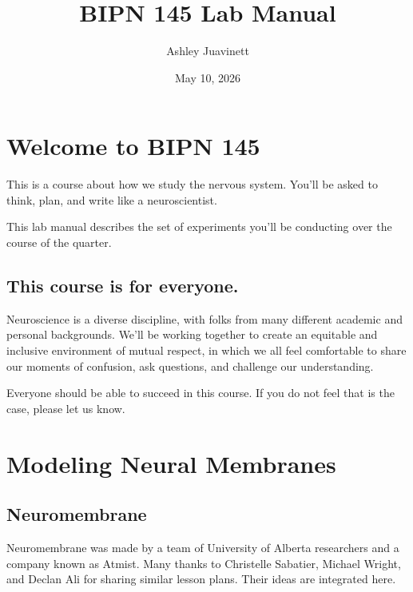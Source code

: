 \documentclass[letterpaper,10pt,english]{jupyterBook}
\title{BIPN 145 Lab Manual}
\date{May 10, 2026}
\author{Ashley Juavinett}
\begin{document}
\pagestyle{empty}
\sphinxmaketitle
\pagestyle{plain}
\sphinxtableofcontents
\pagestyle{normal}
\label{\detokenize{Cover::doc}}


\sphinxstepscope


\chapter{Welcome to BIPN 145}
\label{\detokenize{Introduction:welcome-to-bipn-145}}\label{\detokenize{Introduction::doc}}
\sphinxAtStartPar
This is a course about how we study the nervous system.
You’ll be asked to think, plan, and write like a neuroscientist.

\sphinxAtStartPar
This lab manual describes the set of experiments
you’ll be conducting over the course of the quarter.


\section{This course is for everyone.}
\label{\detokenize{Introduction:this-course-is-for-everyone}}
\sphinxAtStartPar
Neuroscience is a diverse discipline, with folks from many different academic and personal backgrounds. We’ll be working together to create an equitable and inclusive environment of mutual respect, in which we all feel comfortable to share our moments of confusion, ask questions, and challenge our understanding.

\sphinxAtStartPar
Everyone should be able to succeed in this course.
If you do not feel that is the case, please let us know.

\sphinxstepscope


\chapter{Modeling Neural Membranes}
\label{\detokenize{ModelingNeuralMembranes:modeling-neural-membranes}}\label{\detokenize{ModelingNeuralMembranes::doc}}
\sphinxAtStartPar
{}


\section{Neuromembrane}
\label{\detokenize{ModelingNeuralMembranes:neuromembrane}}
\sphinxAtStartPar
Neuromembrane was made by a team of University of Alberta researchers and a company known as Atmist. Many thanks to Christelle Sabatier, Michael Wright, and Declan Ali for sharing similar lesson plans. Their ideas are integrated here.
\end{document}
